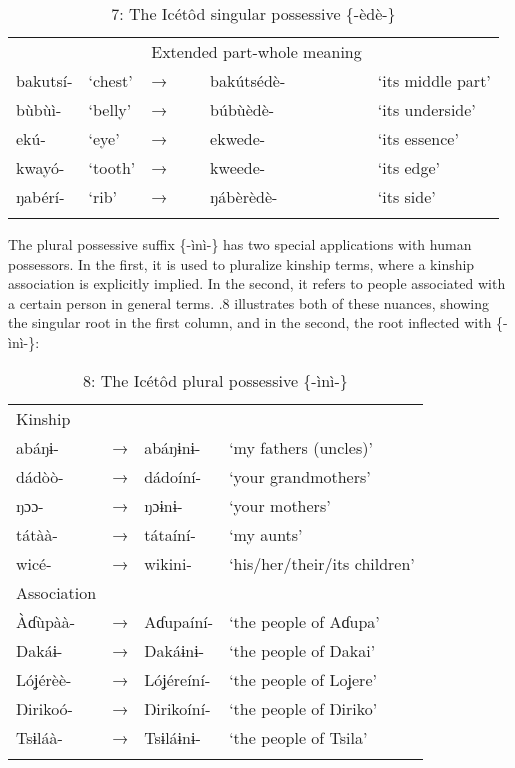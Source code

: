 \begin{table}
\caption{7: The Icétôd singular possessive \{-èdè-\}}
\label{tab:4}


\begin{tabularx}{\textwidth}{XXXXX}
\lsptoprule

\multicolumn{2}{X}{Root meaning} &  & \multicolumn{2}{X}{Extended part-whole meaning}\\
bakutsí- & ‘chest’ & → & bakútsédè- & ‘its middle part’\\
bùbùì- & ‘belly’ & → & búbùèdè- & ‘its underside’\\
ekú- & ‘eye’ & → & ekwede- & ‘its essence’\\
kwayó- & ‘tooth’ & → & kweede- & ‘its edge’\\
ŋabérí- & ‘rib’ & → & ŋábèrèdè- & ‘its side’\\
\lspbottomrule
\end{tabularx}
\end{table}
The plural possessive suffix \{-ìnì-\} has two special applications with human possessors. In the first, it is used to pluralize kinship terms, where a kinship association is explicitly implied. In the second, it refers to people associated with a certain person in general terms. .8 illustrates both of these nuances, showing the singular root in the first column, and in the second, the root inflected with \{-ìnì-\}:


\begin{table}
\caption{8: The Icétôd plural possessive \{-ìnì-\}}
\label{tab:4}


\begin{tabularx}{\textwidth}{XXXX}
\lsptoprule

Kinship &  &  & \\
abáŋɨ- & → & abáŋɨnɨ- & ‘my fathers (uncles)’\\
dádòò- & → & dádoíní- & ‘your grandmothers’\\
ŋɔɔ- & → & ŋɔɨnɨ- & ‘your mothers’\\
tátàà- & → & tátaíní- & ‘my aunts’\\
wicé- & → & wikini- & ‘his/her/their/its children’\\
Association &  &  & \\
\`{A}ɗùpàà- & → & Aɗupaíní- & ‘the people of Aɗupa’\\
Dakáɨ- & → & Dakáɨnɨ- & ‘the people of Dakai’\\
Lóʝérèè- & → & Lóʝéreíní- & ‘the people of Loʝere’\\
Ŋirikoó- & → & Ŋirikoíní- & ‘the people of Ŋiriko’\\
Tsɨláà- & → & Tsɨláɨnɨ- & ‘the people of Tsila’\\
\lspbottomrule
\end{tabularx}
\end{table}

